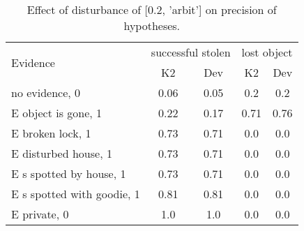 \begin{table}\begin{tabular}{l|cc|cc}\toprule\multirow{2}{*}{Evidence} & \multicolumn{2}{c}{successful stolen}& \multicolumn{2}{c}{lost object}\\& {K2} & {Dev}& {K2} & {Dev}\\\midrule
no evidence, 0 & 0.06&0.05&0.2&0.2\\E object is gone, 1 & 0.22&0.17&\cellcolor{Bittersweet}0.71&\cellcolor{Bittersweet}0.76\\E broken lock, 1 & 0.73&0.71&0.0&0.0\\E disturbed house, 1 & 0.73&0.71&0.0&0.0\\E s spotted by house, 1 & 0.73&0.71&0.0&0.0\\E s spotted with goodie, 1 & 0.81&0.81&0.0&0.0\\E private, 0 & 1.0&1.0&0.0&0.0\\\bottomrule\end{tabular}\caption{Effect of disturbance of [0.2, 'arbit'] on precision of hypotheses.}\end{table}
